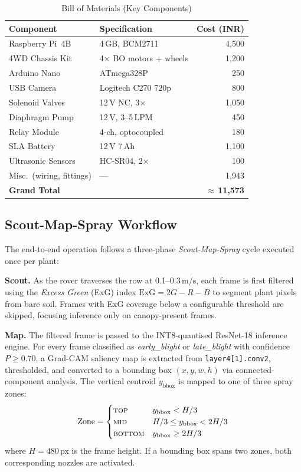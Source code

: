\documentclass[conference]{IEEEtran}
\begin{document}
\begin{table}[htbp]
\caption{Bill of Materials (Key Components)}
\label{tab:bom}
\centering
\begin{tabular}{@{}llr@{}}
\toprule
\textbf{Component} & \textbf{Specification} & \textbf{Cost (INR)} \\
\midrule
Raspberry Pi~4B    & 4\,GB, BCM2711      & 4,500 \\
4WD Chassis Kit    & 4$\times$ BO motors + wheels & 1,200 \\
Arduino Nano       & ATmega328P          & 250 \\
USB Camera         & Logitech C270 720p  & 800 \\
Solenoid Valves    & 12\,V NC, 3$\times$ & 1,050 \\
Diaphragm Pump     & 12\,V, 3--5\,LPM   & 450 \\
Relay Module       & 4-ch, optocoupled  & 180 \\
SLA Battery        & 12\,V 7\,Ah         & 1,100 \\
Ultrasonic Sensors & HC-SR04, 2$\times$  & 100 \\
Misc.~(wiring, fittings) & ---           & 1,943 \\
\midrule
\textbf{Grand Total} & & \textbf{$\approx$\,11,573} \\
\bottomrule
\end{tabular}
\end{table}

\subsection{Scout-Map-Spray Workflow}
\label{sec:workflow}

The end-to-end operation follows a three-phase \emph{Scout-Map-Spray}
cycle executed once per plant:

\textbf{Scout.} As the rover traverses the row at 0.1--0.3\,m/s, each
frame is first filtered using the \emph{Excess Green} (ExG) index
$\mathrm{ExG} = 2G - R - B$ to segment plant pixels from bare soil.
Frames with ExG coverage below a configurable threshold are skipped,
focusing inference only on canopy-present frames.

\textbf{Map.} The filtered frame is passed to the INT8-quantised
ResNet-18 inference engine. For every frame classified as
\emph{early\_blight} or \emph{late\_blight} with confidence
$P \geq 0.70$, a Grad-CAM saliency map is extracted from
\texttt{layer4[1].conv2}, thresholded, and converted to a bounding
box $(x, y, w, h)$ via connected-component analysis.
The vertical centroid $y_{\text{bbox}}$ is mapped to one of three
spray zones:
\begin{equation}
    \text{Zone} =
    \begin{cases}
        \textsc{top}    & y_{\text{bbox}} < H/3 \\
        \textsc{mid}    & H/3 \leq y_{\text{bbox}} < 2H/3 \\
        \textsc{bottom} & y_{\text{bbox}} \geq 2H/3
    \end{cases}
\end{equation}
where $H = 480$\,px is the frame height. If a bounding box spans two
zones, both corresponding nozzles are activated.
\end{document}

